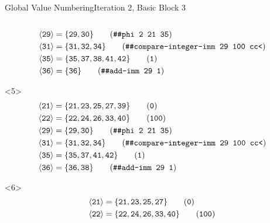 \documentclass{beamer}
\newcommand{\vn}[1]{\ensuremath{\langle\texttt{#1}\rangle}}
\newcommand{\vreg}[1]{\texttt{#1}}
\begin{document}
\begin{frame}[fragile]{Global Value Numbering}{Iteration 2, Basic Block 3}
\begin{columns}[t,onlytextwidth]
\begin{column}{.5\textwidth}
\begin{onlyenv}
\begin{align*}
          \vn{29} &= \{\vreg{29},
                       \vreg{30}\} \tag{\texttt{\#\#phi 2 21 35}} \\
          \vn{31} &= \{\vreg{31},
                       \vreg{32},
                       \vreg{34}\} \tag{\texttt{\#\#compare-integer-imm 29 100 cc<}} \\
          \vn{35} &= \{\vreg{35},
                       \vreg{37},
                       \vreg{38},
                       \vreg{41},
                       \vreg{42}\} \tag{\texttt{1}} \\
          \vn{36} &= \{\vreg{36}\} \tag{\texttt{\#\#add-imm 29 1}}
        \end{align*}
      \end{onlyenv}
      \begin{onlyenv}<5>
        \begin{align*}
          \vn{21} &= \{\vreg{21},
                       \vreg{23},
                       \vreg{25},
                       \vreg{27},
                       \vreg{39}\} \tag{\texttt{0}} \\
          \vn{22} &= \{\vreg{22},
                       \vreg{24},
                       \vreg{26},
                       \vreg{33},
                       \vreg{40}\} \tag{\texttt{100}} \\
          \vn{29} &= \{\vreg{29},
                       \vreg{30}\} \tag{\texttt{\#\#phi 2 21 35}} \\
          \vn{31} &= \{\vreg{31},
                       \vreg{32},
                       \vreg{34}\} \tag{\texttt{\#\#compare-integer-imm 29 100 cc<}} \\
          \vn{35} &= \{\vreg{35},
                       \vreg{37},
                       \vreg{41},
                       \vreg{42}\} \tag{\texttt{1}} \\
          \vn{36} &= \{\vreg{36},
                       \vreg{38}\} \tag{\texttt{\#\#add-imm 29 1}}
        \end{align*}
      \end{onlyenv}
      \begin{onlyenv}<6>
        \begin{align*}
          \vn{21} &= \{\vreg{21},
                       \vreg{23},
                       \vreg{25},
                       \vreg{27}\} \tag{\texttt{0}} \\
          \vn{22} &= \{\vreg{22},
                       \vreg{24},
                       \vreg{26},
                       \vreg{33},
                       \vreg{40}\} \tag{\texttt{100}} \\

\end{align*}
\end{onlyenv}
\end{column}
\end{columns}
\end{frame}
\end{document}
